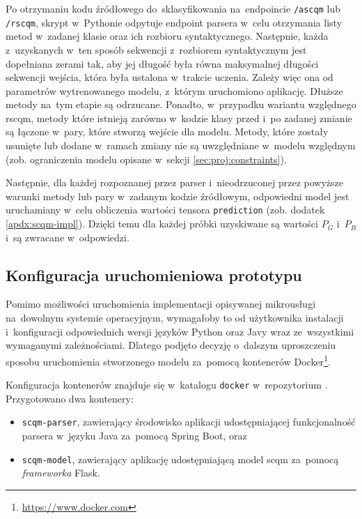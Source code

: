 \documentclass[twoside]{praca}
\begin{document}
Po otrzymaniu kodu źródłowego do~sklasyfikowania na~endpoincie \texttt{/ascqm} lub \texttt{/rscqm}, skrypt w~Pythonie odpytuje endpoint parsera w~celu otrzymania listy metod w~zadanej klasie oraz ich rozbioru syntaktycznego. Następnie, każda z~uzyskanych w~ten sposób sekwencji z~rozbiorem syntaktycznym jest dopełniana zerami tak, aby jej długość była równa maksymalnej długości sekwencji wejścia, która była ustalona w~trakcie uczenia. Zależy więc ona od parametrów wytrenowanego modelu, z~którym uruchomiono aplikację. Dłuższe metody na~tym etapie są odrzucane. Ponadto, w~przypadku wariantu względnego \gls{rscqm}, metody które istnieją zarówno w~kodzie klasy przed i~po zadanej zmianie są łączone w~pary, które stworzą wejście dla modelu. Metody, które zostały usunięte lub dodane w~ramach zmiany nie są uwzględniane w~modelu względnym (zob. ograniczenia modelu opisane w~sekcji \ref{sec:proj:constraints}).

Następnie, dla każdej rozpoznanej przez parser i~nieodrzuconej przez powyższe warunki metody lub pary w~zadanym kodzie źródłowym, odpowiedni model jest uruchamiany w~celu obliczenia wartości tensora \texttt{prediction} (zob. dodatek \ref{apdx:scqm-impl}). Dzięki temu dla każdej próbki uzyskiwane są wartości $P_G$ i~$P_B$ i~są zwracane w~odpowiedzi.

\subsection{Konfiguracja uruchomieniowa prototypu}
\label{sec:eval:docker}

Pomimo możliwości uruchomienia implementacji opisywanej mikrousługi na~dowolnym systemie operacyjnym, wymagałoby to od użytkownika instalacji i~konfiguracji odpowiednich wersji języków Python oraz Javy wraz ze~wszystkimi wymaganymi zależnościami. Dlatego podjęto decyzję o~dalszym uproszczeniu sposobu uruchomienia stworzonego modelu za~pomocą kontenerów Docker\footnote{\url{https://www.docker.com}}.

Konfiguracja kontenerów znajduje się w~katalogu \texttt{docker} w~repozytorium \cite{fracz:scqm}. Przygotowano dwa kontenery:

\begin{itemize}
    \item \texttt{scqm-parser}, zawierający środowisko aplikacji udostępniającej funkcjonalność parsera w~języku Java za~pomocą Spring Boot, oraz
    \item \texttt{scqm-model}, zawierający aplikację udostępniającą model \gls{scqm} za~pomocą \textit{frameworka} Flask.
\end{itemize}
\end{document}
